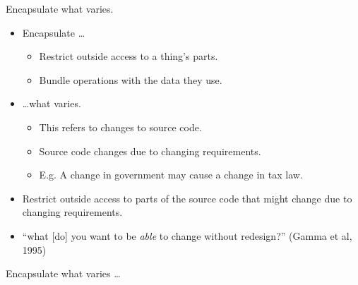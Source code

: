 \documentclass{beamer}
\begin{document}
\begin{frame}{Encapsulate what varies.}
    \begin{itemize}
        \item Encapsulate \ldots
            \begin{itemize}
                \item Restrict outside access to a thing's parts.
                \item Bundle operations with the data they use.
            \end{itemize}
        \item \ldots what varies.
            \begin{itemize}
                \item This refers to changes to source code.
                \item Source code changes due to changing requirements.
                \item E.g. A change in government may cause a change in tax law.
            \end{itemize}
        \item Restrict outside access to parts of the source code that might change due to changing requirements.
        \item ``what [do] you want to be \textit{able} to change without redesign?'' (Gamma et al, 1995)
    \end{itemize}
\end{frame}

\begin{frame}{Encapsulate what varies \ldots}
    \begin{columns}
        \column{\dimexpr\paperwidth-40pt}
        
    \end{columns}
\end{frame}
\end{document}
